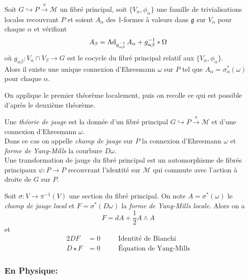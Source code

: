 \documentclass[12pt, a4paper]{book}
\begin{document}
\begin{thm}
Soit $G \hookrightarrow P \overset{\pi}{\to} \mathcal{M}$ un fibré principal, soit $\{V_\alpha, \phi_\alpha\}$ une famille de trivialisations locales recouvrant $P$ et soient $A_\alpha$ des 1-formes à valeurs dans $\mathfrak{g}$ sur $V_\alpha$ pour chaque $\alpha$ et vérifiant 
$$A_\beta = \operatorname{Ad}_{g_{\alpha\beta}^{-1}}A_\alpha + g_{\alpha\beta}^{-1}*\Omega$$ 
où $g_{\alpha\beta}: V_\alpha\cap V_\beta \to G$ est le cocycle du fibré principal relatif aux $\{V_\alpha, \phi_\alpha\}$. \\
Alors il existe une unique connexion d'Ehresmann $\omega$ sur $P$ tel que $A_\alpha = \sigma_\alpha^*(\omega)$ pour chaque $\alpha$.
\end{thm}
\begin{preu}
On applique le premier théorème localement, puis on recolle ce qui est possible d'après le deuxième théorème.
\end{preu}

\begin{defi}
Une \emph{théorie de jauge} est la donnée d'un fibré principal $G \hookrightarrow P \overset{\pi}{\to} \mathcal{M}$ et d'une connexion d'Ehresmann $\omega$. \\
Dans ce cas on appelle \emph{champ de jauge} sur $P$ la connexion d'Ehresmann $\omega$ et \emph{forme de Yang-Mills} la courbure $D\omega$. \\
Une transformation de jauge du fibré principal est un automorphisme de fibrés principaux $\psi: P \to P$ recouvrant l'identité sur $\mathcal{M}$ qui commute avec l'action à droite de $G$ sur $P$.
\end{defi}

\begin{pro}
Soit $\sigma : V\to \pi^{-1}(V)$ une section du fibré principal. On note $A = \sigma^*(\omega)$ le \emph{champ de jauge local} et $F = \sigma^*(D\omega)$ la \emph{forme de Yang-Mills locale}. Alors on a
$$F = dA + \frac{1}{2}A\wedge A$$
et
\begin{alignat*}{2}
DF & = 0   && \quad\text{Identité de Bianchi} \\
D\star F & = 0  && \quad\text{Équation de Yang-Mills}
\end{alignat*}
\end{pro}

\subsubsection{En Physique:}
\end{document}
